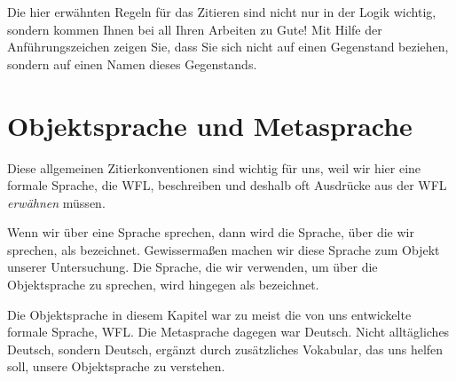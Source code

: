 Die hier erwähnten Regeln für das Zitieren sind nicht nur in der Logik wichtig, sondern kommen Ihnen bei all Ihren Arbeiten zu Gute! Mit Hilfe der Anführungszeichen zeigen Sie, dass Sie sich nicht auf einen Gegenstand beziehen, sondern auf einen Namen dieses Gegenstands.

\section{Objektsprache und Metasprache}
Diese allgemeinen Zitierkonventionen sind wichtig für uns, weil wir hier eine formale Sprache, die WFL, beschreiben und deshalb oft Ausdrücke aus der WFL \emph{erwähnen} müssen. 

Wenn wir über eine Sprache sprechen, dann wird die Sprache, über die wir sprechen, als  bezeichnet. Gewisserma{\ss}en machen wir diese Sprache zum Objekt unserer Untersuchung. Die Sprache, die wir verwenden, um über die Objektsprache zu sprechen, wird hingegen als  bezeichnet.\label{def.metalanguage}



Die Objektsprache in diesem Kapitel war zu meist die von uns entwickelte formale Sprache, WFL. Die Metasprache dagegen war Deutsch. Nicht alltägliches Deutsch, sondern Deutsch, ergänzt durch zusätzliches Vokabular, das uns helfen soll, unsere Objektsprache zu verstehen.

